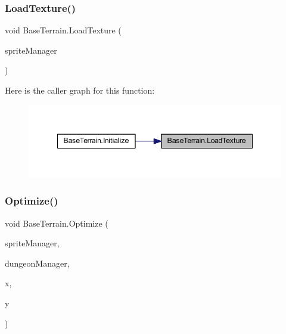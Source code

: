 \subsubsection{\texorpdfstring{LoadTexture()}{LoadTexture()}}
{\footnotesize\ttfamily void Base\+Terrain.\+Load\+Texture (\begin{DoxyParamCaption}\item[{\mbox{\hyperlink{class_sprite_manager}{Sprite\+Manager}}}]{sprite\+Manager }\end{DoxyParamCaption})}

Here is the caller graph for this function\+:\nopagebreak
\begin{figure}[H]
\begin{center}
\leavevmode
\includegraphics[width=348pt]{class_base_terrain_ada3cddbd511be2890cbb9635d997441b_icgraph}
\end{center}
\end{figure}
\mbox{\label{class_base_terrain_abda1c3ac02dc72095eb8c50ef68f8a2e}} 
\subsubsection{\texorpdfstring{Optimize()}{Optimize()}}
{\footnotesize\ttfamily void Base\+Terrain.\+Optimize (\begin{DoxyParamCaption}\item[{\mbox{\hyperlink{class_sprite_manager}{Sprite\+Manager}}}]{sprite\+Manager,  }\item[{\mbox{\hyperlink{class_dungeon_manager}{Dungeon\+Manager}}}]{dungeon\+Manager,  }\item[{int}]{x,  }\item[{int}]{y }\end{DoxyParamCaption})}

\mbox{\label{class_base_terrain_ac52fb05dde7ffc3a3d88af0122516052}} 
